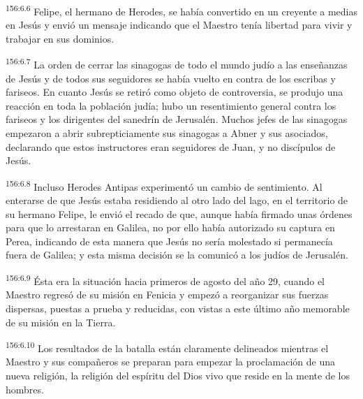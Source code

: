 \par 
\textsuperscript{156:6.6} Felipe, el hermano de Herodes, se había convertido en un creyente a medias en Jesús y envió un mensaje indicando que el Maestro tenía libertad para vivir y trabajar en sus dominios.

\par 
\textsuperscript{156:6.7} La orden de cerrar las sinagogas de todo el mundo judío a las enseñanzas de Jesús y de todos sus seguidores se había vuelto en contra de los escribas y fariseos. En cuanto Jesús se retiró como objeto de controversia, se produjo una reacción en toda la población judía; hubo un resentimiento general contra los fariseos y los dirigentes del sanedrín de Jerusalén. Muchos jefes de las sinagogas empezaron a abrir subrepticiamente sus sinagogas a Abner y sus asociados, declarando que estos instructores eran seguidores de Juan, y no discípulos de Jesús.

\par 
\textsuperscript{156:6.8} Incluso Herodes Antipas experimentó un cambio de sentimiento. Al enterarse de que Jesús estaba residiendo al otro lado del lago, en el territorio de su hermano Felipe, le envió el recado de que, aunque había firmado unas órdenes para que lo arrestaran en Galilea, no por ello había autorizado su captura en Perea, indicando de esta manera que Jesús no sería molestado si permanecía fuera de Galilea; y esta misma decisión se la comunicó a los judíos de Jerusalén.

\par 
\textsuperscript{156:6.9} Ésta era la situación hacia primeros de agosto del año 29, cuando el Maestro regresó de su misión en Fenicia y empezó a reorganizar sus fuerzas dispersas, puestas a prueba y reducidas, con vistas a este último año memorable de su misión en la Tierra.

\par 
\textsuperscript{156:6.10} Los resultados de la batalla están claramente delineados mientras el Maestro y sus compañeros se preparan para empezar la proclamación de una nueva religión, la religión del espíritu del Dios vivo que reside en la mente de los hombres.